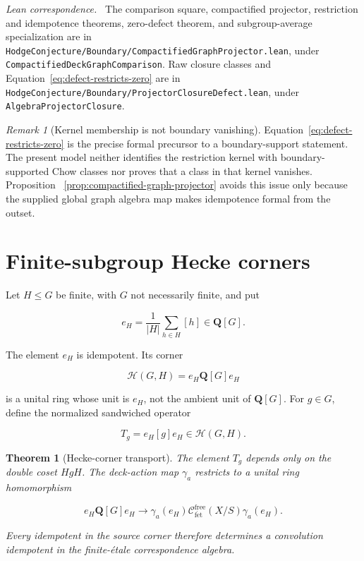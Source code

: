 \documentclass[11pt]{article}
\newtheorem{theorem}{Theorem}[section]
\theoremstyle{definition}
\theoremstyle{remark}
\newtheorem*{remark}{Remark}
\newcommand{\Q}{\mathbf Q}
\newcommand{\fe}{\mathrm{f\acute et}}
\newcommand{\leanpath}[1]{\texttt{\nolinkurl{#1}}}
\newcommand{\boundarysrc}[1]{%
  \leanpath{HodgeConjecture/Boundary/#1}}
\newenvironment{leanfiles}
  {\par\medskip\begingroup\footnotesize\raggedright\noindent
   \textit{Lean correspondence.}\ }
  {\par\endgroup\medskip}
\begin{document}
\begin{leanfiles}
The comparison square, compactified projector, restriction and idempotence
theorems, zero-defect theorem, and subgroup-average specialization are in
\boundarysrc{CompactifiedGraphProjector.lean}, under
\leanpath{CompactifiedDeckGraphComparison}.  Raw closure classes and
Equation~\eqref{eq:defect-restricts-zero} are in
\boundarysrc{ProjectorClosureDefect.lean}, under
\leanpath{AlgebraProjectorClosure}.
\end{leanfiles}

\begin{remark}[Kernel membership is not boundary vanishing]
Equation~\eqref{eq:defect-restricts-zero} is the precise formal precursor to
a boundary-support statement.  The present model neither identifies the
restriction kernel with boundary-supported Chow classes nor proves that a
class in that kernel vanishes.  Proposition
~\ref{prop:compactified-graph-projector} avoids this issue only because the
supplied global graph algebra map makes idempotence formal from the outset.
\end{remark}

\section{Finite-subgroup Hecke corners}
\label{sec:hecke}

Let \(H\leq G\) be finite, with \(G\) not necessarily finite, and put

\[
  e_H=\frac{1}{|H|}\sum_{h\in H}[h]\in\Q[G].
\]

The element \(e_H\) is idempotent.  Its corner

\[
  \mathcal H(G,H)=e_H\Q[G]e_H
\]

is a unital ring whose unit is \(e_H\), not the ambient unit of
\(\Q[G]\).  For \(g\in G\), define the normalized sandwiched operator

\[
  T_g=e_H[g]e_H\in\mathcal H(G,H).
\]

\begin{theorem}[Hecke-corner transport]
\label{thm:hecke}
The element \(T_g\) depends only on the double coset \(HgH\).  The deck-action
map \(\gamma_a\) restricts to a unital ring homomorphism

\[
  e_H\Q[G]e_H
  \longrightarrow
  \gamma_a(e_H)
    \mathcal C_{\fe}^{\mathrm{free}}(X/S)
    \gamma_a(e_H).
\]

Every idempotent in the source corner therefore determines a convolution
idempotent in the finite-\'etale correspondence algebra.
\end{theorem}
\end{document}
